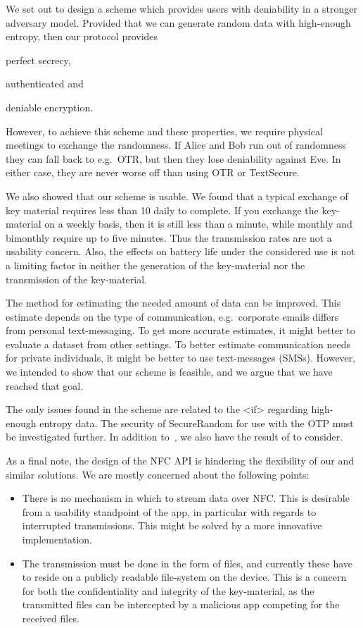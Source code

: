We set out to design a scheme which provides users with deniability in 
a stronger adversary model.
Provided that we can generate random data with high-enough entropy, then our 
protocol provides
\begin{inparablank}
  \item perfect secrecy,
  \item authenticated and
  \item deniable encryption.
\end{inparablank}
However, to achieve this scheme and these properties, we require physical 
meetings to exchange the randomness.
If Alice and Bob run out of randomness they can fall back to e.g.~\ac{OTR}, but 
then they lose deniability against Eve.
In either case, they are never worse off than using \ac{OTR} or TextSecure.

We also showed that our scheme is usable.
We found that a typical exchange of key material requires less than 
\unit{10}{\second} daily to complete.
If you exchange the key-material on a weekly basis, then it is still less than 
a minute, while monthly and bimonthly require up to five minutes.
Thus the transmission rates are not a usability concern.
Also, the effects on battery life under the considered use is not a limiting 
factor in neither the generation of the key-material nor the transmission of 
the key-material.

The method for estimating the needed amount of data can be improved.
This estimate depends on the type of communication, e.g.~corporate emails 
differs from personal text-messaging.
To get more accurate estimates, it might better to evaluate a dataset from 
other settings.
To better estimate communication needs for private individuals, it might be 
better to use text-messages (SMSs).
However, we intended to show that our scheme is feasible, and we argue that we 
have reached that goal.

The only issues found in the scheme are related to the <if> regarding 
high-enough entropy data.
The security of SecureRandom for use with the \ac{OTP} must be investigated 
further.
In addition to~\cite{JavaRandomness,AndroidLowEntropyMyth}, we also have the 
result of \citet{UniversalityOTP} to consider.

As a final note, the design of the \ac{NFC} API is hindering the flexibility of 
our and similar solutions.
We are mostly concerned about the following points:
\begin{itemize}
  \item There is no mechanism in which to stream data over \ac{NFC}\@.
    This is desirable from a usability standpoint of the app, in particular 
    with regards to interrupted transmissions.
    This might be solved by a more innovative implementation.
  \item The transmission must be done in the form of files, and currently these 
    have to reside on a publicly readable file-system on the device.
    This is a concern for both the confidentiality and integrity of the 
    key-material, as the transmitted files can be intercepted by a malicious 
    app competing for the received files.
\end{itemize}

